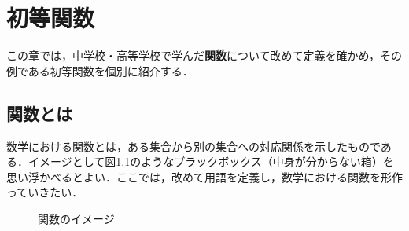 \chapter{初等関数}\label{chap:function}
この章では，中学校・高等学校で学んだ\textbf{関数}について改めて定義を確かめ，その例である初等関数を個別に紹介する．

\section{関数とは}
数学における関数とは，ある集合から別の集合への対応関係を示したものである．イメージとして図\ref{fig:blackbox}のようなブラックボックス（中身が分からない箱）を思い浮かべるとよい．ここでは，改めて用語を定義し，数学における関数を形作っていきたい．

\vspace*{4cm}
\begin{figure}[!h]
	\caption{関数のイメージ}
	\label{fig:blackbox}
\end{figure}

